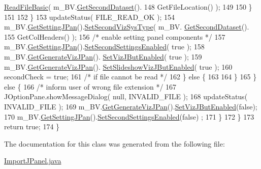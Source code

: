 \begin{DoxyCode}
      \hyperlink{class_dataset_abddca267426cbfcbc9a7d250ec53a5e5}{ReadFileBasic}( m\_BV.\hyperlink{class_bob_viz_a2826dca37585b5effe3a2f2222f17ada}{GetSecondDataset}().
148                                     GetFileLocation() );
149                             
150                         \}
151                             
152                     \}
153                     updateStatus( FILE\_READ\_OK );
154                     m\_BV.\hyperlink{class_bob_viz_a10dab616869fe644d16c2ccf78627af5}{GetSettingJPan}().\hyperlink{class_setting_j_panel_a8c7f693b437db5e8890346d34b68f034}{SetSecondVizSysType}( m\_BV.
      \hyperlink{class_bob_viz_a2826dca37585b5effe3a2f2222f17ada}{GetSecondDataset}().
155                             GetColHeaders() );
156                     \textcolor{comment}{/* enable setting panel components */}
157                     m\_BV.\hyperlink{class_bob_viz_a10dab616869fe644d16c2ccf78627af5}{GetSettingJPan}().\hyperlink{class_setting_j_panel_af44d07f356aa8217418fe0878a50f48d}{SetSecondSettingsEnabled}( \textcolor{keyword}{
      true} );
158                     m\_BV.\hyperlink{class_bob_viz_a4b1e563e0fa60594fa0beb1d50438824}{GetGenerateVizJPan}().
      \hyperlink{class_selection_viz_j_panel_ab942f7a1e094e8d3df0df172499c8878}{SetVizJButEnabled}( \textcolor{keyword}{true} );
159                     m\_BV.\hyperlink{class_bob_viz_a4b1e563e0fa60594fa0beb1d50438824}{GetGenerateVizJPan}().
      \hyperlink{class_selection_viz_j_panel_afe28337fc26eb95b02450f6138977c90}{SetSlideshowVizJButEnabled}( \textcolor{keyword}{true} );
160                     secondCheck = \textcolor{keyword}{true};
161                 \textcolor{comment}{/* if file cannot be read */}
162                 \} \textcolor{keywordflow}{else} \{
163                     
164                 \}
165             \} \textcolor{keywordflow}{else} \{
166                 \textcolor{comment}{/* inform user of wrong file extension */}
167                 JOptionPane.showMessageDialog( null, INVALID\_FILE );
168                 updateStatus( INVALID\_FILE );
169                 m\_BV.\hyperlink{class_bob_viz_a4b1e563e0fa60594fa0beb1d50438824}{GetGenerateVizJPan}().\hyperlink{class_selection_viz_j_panel_ab942f7a1e094e8d3df0df172499c8878}{SetVizJButEnabled}(\textcolor{keyword}{false});
170                 m\_BV.\hyperlink{class_bob_viz_a10dab616869fe644d16c2ccf78627af5}{GetSettingJPan}().\hyperlink{class_setting_j_panel_af44d07f356aa8217418fe0878a50f48d}{SetSecondSettingsEnabled}(\textcolor{keyword}{false})
      ;
171             \}
172         \}
173         \textcolor{keywordflow}{return} \textcolor{keyword}{true};
174     \}
\end{DoxyCode}


The documentation for this class was generated from the following file\-:\begin{DoxyCompactItemize}
\item 
\hyperlink{_import_j_panel_8java}{Import\-J\-Panel.\-java}\end{DoxyCompactItemize}
